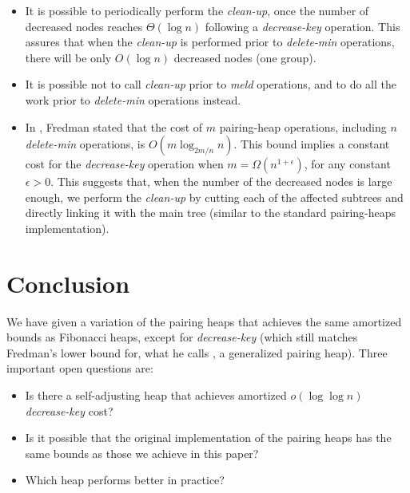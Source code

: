 \begin{itemize}

\item It is possible to periodically perform the {\it clean-up}, once the number of decreased nodes reaches $\Theta(\log{n})$ following a {\it decrease-key} operation. This assures that when the {\it clean-up} is performed prior to {\it delete-min} operations, there will be only $O(\log{n})$ decreased nodes (one group). 

\item It is possible not to call {\it clean-up} prior to {\it meld} operations, and to do all the work prior to {\it delete-min} operations instead.

\item  In \cite{f}, Fredman stated that the cost of $m$ pairing-heap operations, including $n$ {\it delete-min} operations, is $O(m \log_{2m/n}{n})$. This bound implies a constant cost for the {\it decrease-key} operation when $m=\Omega(n^{1+\epsilon})$, for any constant $\epsilon>0$. This suggests that, when the number of the decreased nodes is large enough, we perform the {\it clean-up} by cutting each of the affected subtrees and directly linking it with the main tree (similar to the standard pairing-heaps implementation). 

\end{itemize}


\section{Conclusion}
We have given a variation of the pairing heaps that achieves the same amortized bounds as Fibonacci heaps, except for {\it decrease-key} (which still matches Fredman's lower bound for, what he calls \cite{f}, a generalized pairing heap). Three important open questions are:

\begin{itemize}
\item Is there a self-adjusting heap that achieves amortized $o(\log \log{n})$ {\it decrease-key} cost?
\item Is it possible that the original implementation of the pairing heaps has the same bounds as those we achieve in this paper?
\item Which heap performs better in practice? 
\end{itemize}




